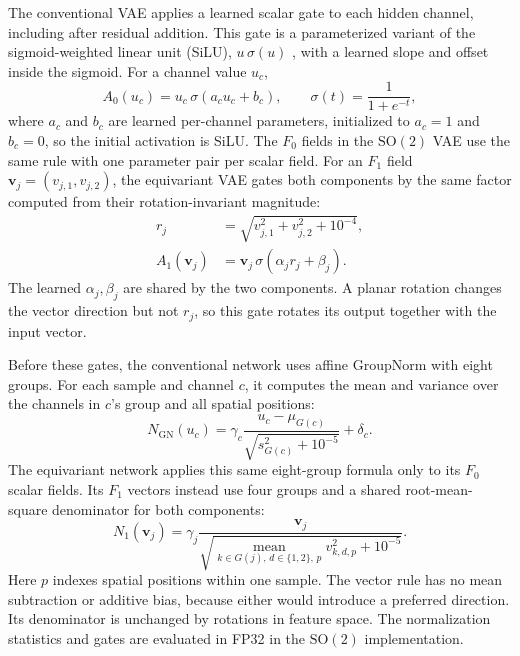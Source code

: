 \documentclass[conference,a4paper]{IEEEtran}
\newcommand{\SOtwo}{\mathrm{SO}(2)}
\begin{document}
The conventional VAE applies a learned scalar gate to each hidden channel,
including after residual addition. This gate is a parameterized variant of
the sigmoid-weighted linear unit (SiLU), $u\,\sigma(u)$
\cite{elfwing_silu_2018}, with a learned slope and offset inside the sigmoid.
For a channel value $u_c$,
\begin{equation}
A_0(u_c)=u_c\,\sigma(a_cu_c+b_c),\qquad
\sigma(t)=\frac{1}{1+e^{-t}},
\label{eq:scalar-gate}
\end{equation}
where $a_c$ and $b_c$ are learned per-channel parameters, initialized to
$a_c=1$ and $b_c=0$, so the initial activation is SiLU. The $F_0$ fields in
the $\SOtwo$ VAE use the same rule with one parameter pair per scalar field.
For an $F_1$ field $\mathbf v_j=(v_{j,1},v_{j,2})$, the equivariant VAE gates
both components by the same factor computed from their rotation-invariant
magnitude:
\begin{equation}
\begin{aligned}
r_j&=\sqrt{v_{j,1}^{2}+v_{j,2}^{2}+10^{-4}},\\
A_1(\mathbf v_j)&=\mathbf v_j\,\sigma(\alpha_j r_j+\beta_j).
\end{aligned}
\label{eq:radial-gate}
\end{equation}
The learned $\alpha_j,\beta_j$ are shared by the two components. A planar
rotation changes the vector direction but not $r_j$, so this gate rotates its
output together with the input vector.

Before these gates, the conventional network uses affine GroupNorm with
eight groups. For each sample and channel $c$, it computes the mean and
variance over the channels in $c$'s group and all spatial positions:
\begin{equation}
N_{\mathrm{GN}}(u_c)=\gamma_c
\frac{u_c-\mu_{G(c)}}{\sqrt{s^2_{G(c)}+10^{-5}}}+\delta_c.
\label{eq:group-norm}
\end{equation}
The equivariant network applies this same eight-group formula only to its
$F_0$ scalar fields. Its $F_1$ vectors instead use four groups and a shared
root-mean-square denominator for both components:
\begin{equation}
N_1(\mathbf v_j)=\gamma_j
\frac{\mathbf v_j}{\sqrt{
\underset{k\in G(j),\,d\in\{1,2\},\,p}{\operatorname{mean}}
 v_{k,d,p}^{2}+10^{-5}}}.
\label{eq:vector-norm}
\end{equation}
Here $p$ indexes spatial positions within one sample. The vector rule has
no mean subtraction or additive bias, because either would introduce a
preferred direction. Its denominator is unchanged by rotations in feature
space. The normalization statistics and gates are evaluated in FP32 in the
$\SOtwo$ implementation.
\end{document}
